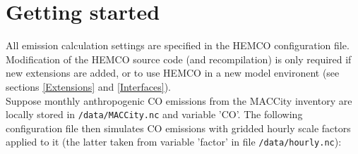 \documentclass[12pt,a4paper]{article} %
\begin{document}
\section{Getting started} \label{Getting_started}
All emission calculation settings are specified in the HEMCO configuration file. Modification of the HEMCO source code (and recompilation) is only required if new extensions are added, or to use HEMCO in a new model environent (see sections \ref{Extensions} and \ref{Interfaces}).\\

Suppose monthly anthropogenic CO emissions from the MACCity inventory \citep{Lamarque_ACP_2010} are locally stored in \texttt{/data/MACCity.nc} and variable 'CO'. The following configuration file then simulates CO emissions with gridded hourly scale factors applied to it (the latter taken from variable 'factor' in file \texttt{/data/hourly.nc}):\\

\end{document}
